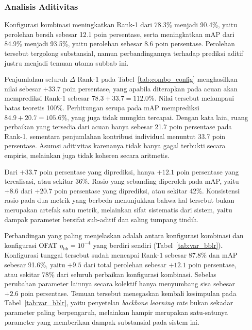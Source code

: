 \subsubsection{Analisis Aditivitas}

Konfigurasi kombinasi meningkatkan Rank-1 dari 78.3\% menjadi 90.4\%, yaitu perolehan bersih sebesar 12.1 poin persentase, serta meningkatkan mAP dari 84.9\% menjadi 93.5\%, yaitu perolehan sebesar 8.6 poin persentase. Perolehan tersebut tergolong substansial, namun perbandingannya terhadap prediksi aditif justru menjadi temuan utama subbab ini.

Penjumlahan seluruh $\Delta$ Rank-1 pada Tabel~\ref{tab:combo_config} menghasilkan nilai sebesar $+33{.}7$ poin persentase, yang apabila diterapkan pada acuan akan memprediksi Rank-1 sebesar $78{.}3 + 33{.}7 = 112{.}0\%$. Nilai tersebut melampaui batas teoretis 100\%. Perhitungan serupa pada mAP memprediksi $84{.}9 + 20{.}7 = 105{.}6\%$, yang juga tidak mungkin tercapai. Dengan kata lain, ruang perbaikan yang tersedia dari acuan hanya sebesar 21.7 poin persentase pada Rank-1, sementara penjumlahan kontribusi individual menuntut 33.7 poin persentase. Asumsi aditivitas karenanya tidak hanya gagal terbukti secara empiris, melainkan juga tidak koheren secara aritmetis.

Dari $+33{.}7$ poin persentase yang diprediksi, hanya $+12{.}1$ poin persentase yang terealisasi, atau sekitar 36\%. Rasio yang sebanding diperoleh pada mAP, yaitu $+8{.}6$ dari $+20{.}7$ poin persentase yang diprediksi, atau sekitar 42\%. Konsistensi rasio pada dua metrik yang berbeda menunjukkan bahwa hal tersebut bukan merupakan artefak satu metrik, melainkan sifat sistematis dari sistem, yaitu dampak parameter bersifat sub-aditif dan saling tumpang tindih.

Perbandingan yang paling menjelaskan adalah antara konfigurasi kombinasi dan konfigurasi OFAT $\eta_{\text{bb}}=10^{-4}$ yang berdiri sendiri (Tabel~\ref{tab:var_bblr}). Konfigurasi tunggal tersebut sudah mencapai Rank-1 sebesar 87.8\% dan mAP sebesar 91.6\%, yaitu $+9{.}5$ dari total perolehan sebesar $+12{.}1$ poin persentase, atau sekitar 78\% dari seluruh perbaikan konfigurasi kombinasi. Sebelas perubahan parameter lainnya secara kolektif hanya menyumbang sisa sebesar $+2{.}6$ poin persentase. Temuan tersebut menegaskan kembali kesimpulan pada Tabel~\ref{tab:var_bblr}, yaitu penyetelan \textit{backbone learning rate} bukan sekadar parameter paling berpengaruh, melainkan hampir merupakan satu-satunya parameter yang memberikan dampak substansial pada sistem ini.

